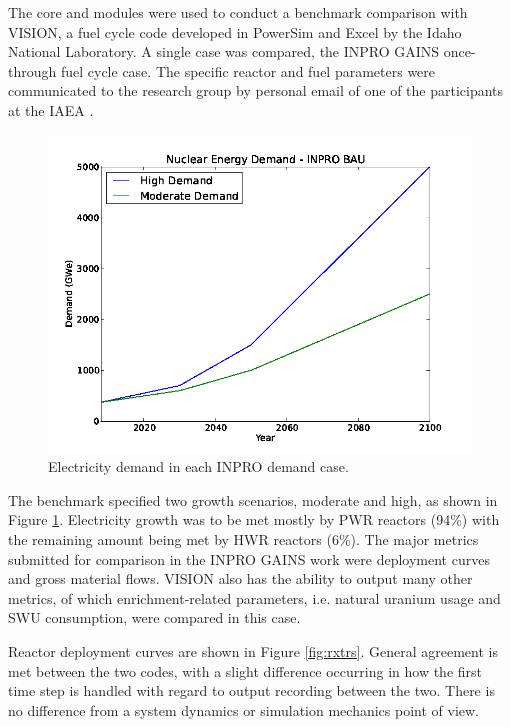 The \Cyclus core and \Cycamore modules were used to conduct a benchmark
comparison with VISION, a fuel cycle code developed in PowerSim and Excel by the
Idaho National Laboratory. A single case was compared, the INPRO GAINS
\cite{_international_2009} once-through fuel cycle case. The specific reactor
and fuel parameters were communicated to the research group by personal email of
one of the participants at the IAEA \cite{dixon_re:_2009}.

\begin{figure}[ht]
  \includegraphics[width=\linewidth]{./chapters/prevwork/graphs/inpro-demand.png}
  \caption{Electricity demand in each INPRO demand case.}
  \label{fig:inpro-demand}
\end{figure}

The benchmark specified two growth scenarios, moderate and high, as shown in
Figure \ref{fig:inpro-demand}. Electricity growth was to be met mostly by PWR
reactors (94\%) with the remaining amount being met by HWR reactors (6\%). The
major metrics submitted for comparison in the INPRO GAINS work were deployment
curves and gross material flows. VISION also has the ability to output many
other metrics, of which enrichment-related parameters, i.e. natural uranium
usage and SWU consumption, were compared in this case.

Reactor deployment curves are shown in Figure \ref{fig:rxtrs}. General agreement
is met between the two codes, with a slight difference occurring in how the first
time step is handled with regard to output recording between the two. There is
no difference from a system dynamics or simulation mechanics point of view. 

